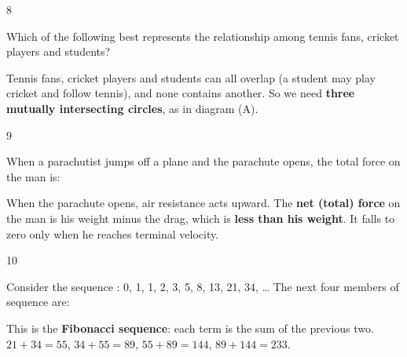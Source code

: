 \begin{question}{8}
{Which of the following best represents the relationship among tennis fans, cricket players and students?\par}
\begin{explain}
Tennis fans, cricket players and students can all overlap (a student may play cricket and follow tennis), and none contains another. So we need \textbf{three mutually intersecting circles}, as in diagram (A).
\end{explain}
\end{question}

\begin{question}{9}
{When a parachutist jumps off a plane and the parachute opens, the total force on the man is:\par}
\begin{explain}
When the parachute opens, air resistance acts upward. The \textbf{net (total) force} on the man is his weight minus the drag, which is \textbf{less than his weight}. It falls to zero only when he reaches terminal velocity.
\end{explain}
\end{question}

\begin{question}{10}
{Consider the sequence : 0, 1, 1, 2, 3, 5, 8, 13, 21, 34, \ldots{} The next four members of sequence are:\par}
\begin{explain}
This is the \textbf{Fibonacci sequence}: each term is the sum of the previous two. $21+34=55$, $34+55=89$, $55+89=144$, $89+144=233$.
\end{explain}
\end{question}


